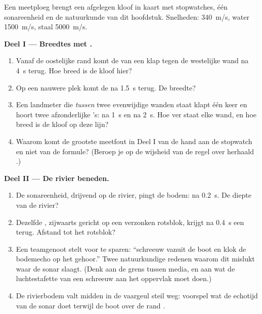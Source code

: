 \begin{problem}\label{pb:g7:sound-production:1}
Een meetploeg brengt een afgelegen kloof in kaart met stopwatches, één
sonareenheid en de natuurkunde van dit hoofdstuk.
Snelheden:  \qty{340}{m/s}, water \qty{1500}{m/s},
staal \qty{5000}{m/s}.

\medskip\noindent\textbf{Deel I --- Breedtes met .}
\begin{enumerate}
  \item Vanaf de oostelijke rand komt de  van een klap tegen de
        westelijke wand na \qty{4}{s} terug. Hoe breed is de kloof
        hier?
  \item Op een nauwere plek komt de  na \qty{1.5}{s} terug. De
        breedte?
  \item Een landmeter die \emph{tussen} twee evenwijdige wanden staat
        klapt één keer en hoort twee afzonderlijke 's: na
        \qty{1}{s} en na \qty{2}{s}. Hoe ver staat elke wand, en hoe
        breed is de kloof op deze lijn?
  \item Waarom komt de grootste meetfout in Deel I van de hand aan de
        stopwatch en niet van de formule? (Beroep je op de wijsheid
        van de regel over herhaald .)
\end{enumerate}

\medskip\noindent\textbf{Deel II --- De rivier beneden.}
\begin{enumerate}[resume]
  \item De sonareenheid, drijvend op de rivier, pingt de bodem:
         na \qty{0.2}{s}. De diepte van de rivier?
  \item Dezelfde , zijwaarts gericht op een verzonken
        rotsblok, krijgt na \qty{0.4}{s} een  terug. Afstand
        tot het rotsblok?
  \item Een teamgenoot stelt voor  te sparen: ``schreeuw
        vanuit de boot en klok de bodemecho op het gehoor.'' Twee
        natuurkundige redenen waarom dit mislukt waar de sonar slaagt.
        (Denk aan de grens tussen media, en aan wat de
        luchtestafette van een schreeuw aan het oppervlak moet
        doen.)
  \item De rivierbodem valt midden in de vaargeul steil weg: voorspel
        wat de echotijd van de sonar doet terwijl de boot over de
        rand .
\end{enumerate}


\end{problem}
